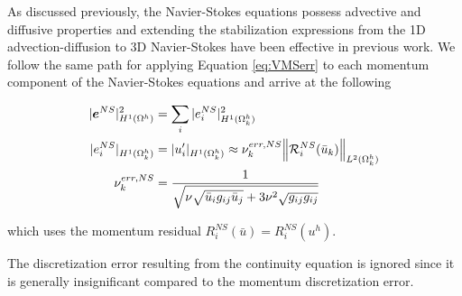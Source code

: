 \label{sec:VMS_NS}
As discussed previously, the Navier-Stokes equations possess advective and diffusive properties and extending the stabilization expressions from the 1D advection-diffusion to 3D Navier-Stokes have been effective in previous work.
We follow the same path for applying Equation \ref{eq:VMSerr} to each momentum component of the Navier-Stokes equations and arrive at the following

\begin{align}
    |\bm{e}^{NS}|^2_{H^{1}(\Omega^h)} &= \sum_{i}|e^{NS}_i|^2_{H^{1}(\Omega^h_k)} \\
    |e^{NS}_i|_{H^{1}(\Omega^h_k)} &= |u_i'|_{H^{1}(\Omega^h_k)} \approx \nu^{err,NS}_{k} \norm{\mathcal{R}^{NS}_i (\bar{u}_k)}_{L^2(\Omega^h_k)} \\
    \nu^{err,NS}_{k} &= \dfrac{1}{\sqrt{ \nu\sqrt{\bar{u}_i g_{ij} \bar{u}_j} + 3\nu^2\sqrt{g_{ij}g_{ij}}  }  } \\
    \label{eq:VMSerrNS}
\end{align} 

\noindent which uses the momentum residual $R^{NS}_i(\bar{u})=R^{NS}_i(u^h)$.

The discretization error resulting from the continuity equation is ignored since it is generally insignificant compared to the momentum discretization error.

\iffalse
One noticeable omission from the $\nu^{err}_e$ expression is any dependency on the time step, which is commonly found in stabilization expressions. 
As a reminder, the current form for the error-constant is derived from a steady-state advection-diffusion problem, and we are interested in the effectiveness of this current form.
Any extensions to the error-constant pave the way for future work.

This approach differs from previous work in that we use the $\HOne$-seminorm to measure the error whereas Hauke et al. \cite{hauke2008variational,hauke2015variational} focuses on the $L^2$ and $L^1$ norms. 
Moreover, we reach the form of the error constant through a direct extension of the 1D advection-diffusion setting to multidimensional settings which has not been done previously.
\fi

